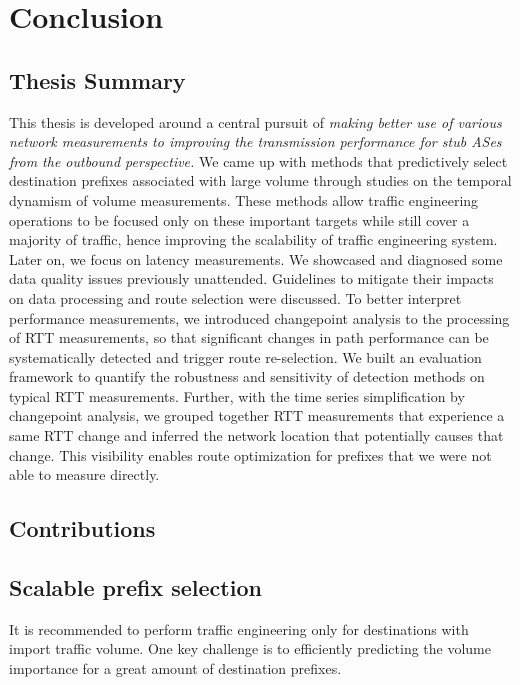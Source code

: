 \chapter{Conclusion}

\section{Thesis Summary}

This thesis is developed around a central pursuit of \textit{making better use of various network measurements to improving the transmission performance for stub ASes from the outbound perspective.}
We came up with methods that predictively select destination prefixes associated with large volume through studies on the temporal dynamism of volume measurements.
These methods allow traffic engineering operations to be focused only on these important targets while still cover a majority of traffic, hence improving the scalability of traffic engineering system.
Later on, we focus on latency measurements. 
We showcased and diagnosed some data quality issues previously unattended.
Guidelines to mitigate their impacts on data processing and route selection were discussed.
To better interpret performance measurements, we introduced changepoint analysis to the processing of RTT measurements, so that significant changes in path performance can be systematically detected and trigger route re-selection.
We built an evaluation framework to quantify the robustness and sensitivity of detection methods on typical RTT measurements.
Further, with the time series simplification by changepoint analysis, we grouped together RTT measurements that experience a same RTT change and inferred the network location that potentially causes that change. This visibility enables route optimization for prefixes that we were not able to measure directly.

\section{Contributions}

\section{Scalable prefix selection}
It is recommended to perform traffic engineering only for destinations with import traffic volume. One key challenge is to efficiently predicting the volume importance for a great amount of destination prefixes.


